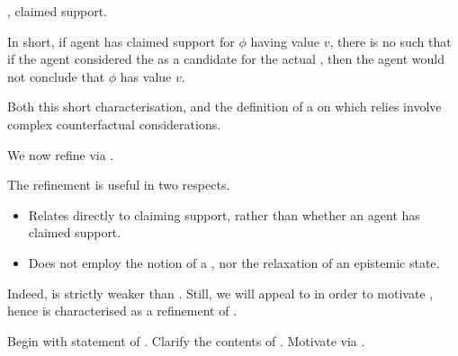 \begin{note}
  \ideaCSA{}, claimed support.

  In short, if agent has claimed support for \(\phi\) having value \(v\), there is no \epN{} \world{} such that if the agent considered the \epN{} \world{} as a candidate for the actual \world{}, then the agent would not conclude that \(\phi\) has value \(v\).

  Both this short characterisation, and the definition of a \sink{} on which \ideaCSA{} relies involve complex counterfactual considerations.

  We now refine \ideaCSA{} via \ideaCSB{}.

  The refinement is useful in two respects.
  \begin{itemize}
  \item Relates directly to claiming support, rather than whether an agent has claimed support.
  \item Does not employ the notion of a \sink{}, nor the relaxation of an epistemic state.
  \end{itemize}
  Indeed, \ideaCSB{} is strictly weaker than \ideaCSA{}.
  Still, we will appeal to \ideaCSA{} in order to motivate \ideaCSB{}, hence \ideaCSB{} is characterised as a refinement of \ideaCSA{}.
\end{note}

\begin{note}
  Begin with statement of \ideaCSB{}.
  Clarify the contents of \ideaCSB{}.
  Motivate \ideaCSB{} via \ideaCSA{}.
\end{note}

